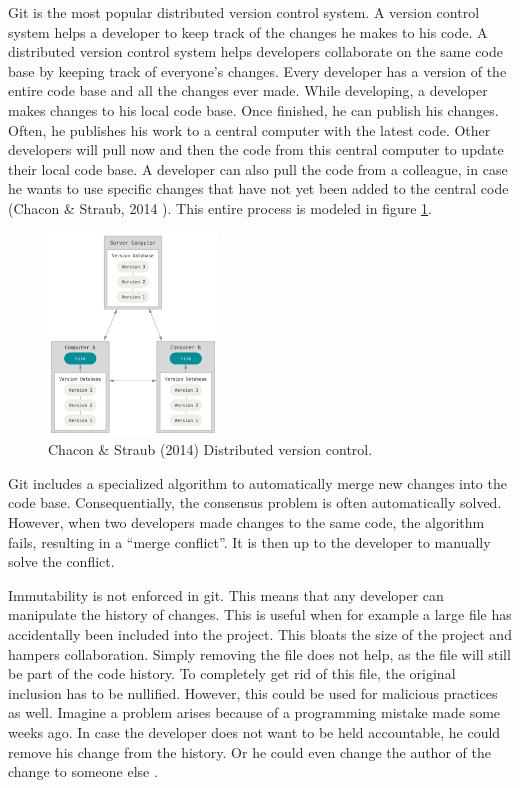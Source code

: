 Git is the most popular distributed version control system. A version control system helps a developer to keep track of the changes he makes to his code. A distributed version control system helps developers collaborate on the same code base by keeping track of everyone's changes. Every developer has a version of the entire code base and all the changes ever made. While developing, a developer makes changes to his local code base. Once finished, he can publish his changes. Often, he publishes his work to a central computer with the latest code. Other developers will pull now and then the code from this central computer to update their local code base. A developer can also pull the code from a colleague, in case he wants to use specific changes that have not yet been added to the central code (Chacon \& Straub, 2014 \cite{git-manual-book}). This entire process is modeled in figure \ref{fig:distributed-vcs}.


\begin{figure}[h]
\centering
\includegraphics[width=0.4\textwidth]{paper-images/distributed.png}
\caption{Chacon \& Straub (2014) Distributed version control.} 
\label{fig:distributed-vcs}
\end{figure}

Git includes a specialized algorithm to automatically merge new changes into the code base. Consequentially, the consensus problem is often automatically solved. However, when two developers made changes to the same code, the algorithm fails, resulting in a ``merge conflict''. It is then up to the developer to manually solve the conflict. 

Immutability is not enforced in git. This means that any developer can manipulate the history of changes. This is useful when for example a large file has accidentally been included into the project. This bloats the size of the project and hampers collaboration. Simply removing the file does not help, as the file will still be part of the code history. To completely get rid of this file, the original inclusion has to be nullified. However, this could be used for malicious practices as well. Imagine a problem arises because of a programming mistake made some weeks ago. In case the developer does not want to be held accountable, he could remove his change from the history. Or he could even change the author of the change to someone else \cite{change-author-commit}.

